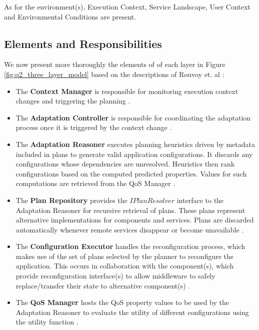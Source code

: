 \documentclass[conference]{IEEEtran}
\begin{document}
As for the environment(s), Execution Context, Service Landscape, User Context and Environmental Conditions are present.

\subsection{\textbf{Elements and Responsibilities}}
We now present more thoroughly the elements of of each layer in Figure \ref{fig:q2_three_layer_model} based on the descriptions of Rouvoy et. al \cite{MUSIC_pdf}:\\

\begin{itemize}
	\item The \textbf{Context Manager} is responsible for monitoring execution context changes and triggering the planning \cite{MUSIC_pdf}.

	\item The \textbf{Adaptation Controller} is responsible for coordinating the adaptation process once it is triggered by the context change \cite{MUSIC_pdf}.

	\item The \textbf{Adaptation Reasoner} executes planning heuristics driven by metadata included in plans to generate valid application configurations. It discards any configurations whose dependencies are unresolved. Heuristics then rank configurations based on the computed predicted properties. Values for such computations are retrieved from the QoS Manager \cite{MUSIC_pdf}.

	\item The \textbf{Plan Repository} provides the $IPlanResolver$ interface to the Adaptation Reasoner for recursive retrieval of plans. These plans represent alternative implementations for components and services. Plans are discarded automatically whenever remote services disappear or become unavailable \cite{MUSIC_pdf}.

	\item The \textbf{Configuration Executor} handles the reconfiguration process, which makes use of the set of plans selected by the planner to reconfigure the application. This occurs in collaboration with the component(s), which provide reconfiguration interface(s) to allow middleware to safely replace/transfer their state to alternative component(s) \cite{MUSIC_pdf}.

	\item The \textbf{QoS Manager} hosts the QoS property values to be used by the Adaptation Reasoner to evaluate the utility of different configurations using the utility function \cite{MUSIC_pdf}.


\end{itemize}
\end{document}
